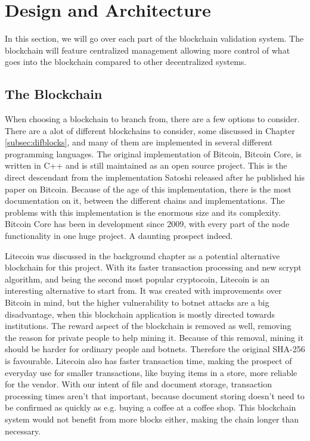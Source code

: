 \documentclass[12pt]{article}
\begin{document}
\section{Design and Architecture}

In this section, we will go over each part of the blockchain validation system. The blockchain will feature centralized management allowing more control of what goes into the blockchain compared to other decentralized systems.

\subsection{The Blockchain}

When choosing a blockchain to branch from, there are a few options to consider. There are a alot of different blockchains to consider, some discussed in Chapter \ref{subsec:difblocks}, and many of them are implemented in several different programming languages. The original implementation of Bitcoin, Bitcoin Core, is written in C++ and is still maintained as an open source project. This is the direct descendant from the implementation Satoshi released after he published his paper on Bitcoin. Because of the age of this implementation, there is the most documentation on it, between the different chains and implementations. The problems with this implementation is the enormous size and its complexity. Bitcoin Core has been in development since 2009, with every part of the node functionality in one huge project. A daunting prospect indeed.

Litecoin was discussed in the background chapter as a potential alternative blockchain for this project. With its faster transaction processing and new scrypt algorithm, and being the second most popular cryptocoin, Litecoin is an interesting alternative to start from. It was created with improvements over Bitcoin in mind, but the higher vulnerability to botnet attacks are a big disadvantage, when this blockchain application is mostly directed towards institutions. The reward aspect of the blockchain is removed as well, removing the reason for private people to help mining it. Because of this removal, mining it should be harder for ordinary people and botnets. Therefore the original SHA-256 is favourable. Litecoin also has faster transaction time, making the prospect of everyday use for smaller transactions, like buying items in a store, more reliable for the vendor. With our intent of file and document storage, transaction processing times aren't that important, because document storing doesn't need to be confirmed as quickly as e.g. buying a coffee at a coffee shop. This blockchain system would not benefit from more blocks either, making the chain longer than necessary. 
\end{document}
